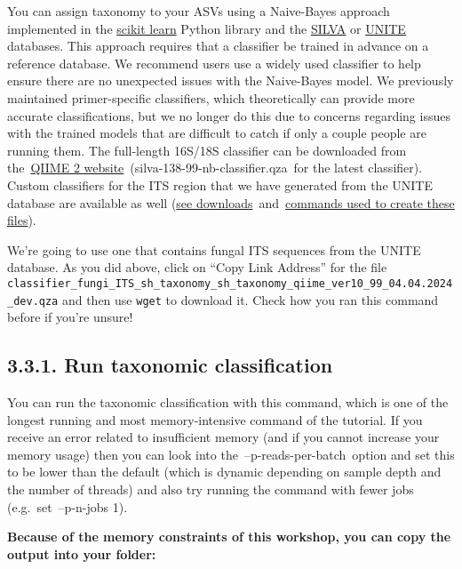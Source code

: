\documentclass[
]{book}
\begin{document}
You can assign taxonomy to your ASVs using a Naive-Bayes approach implemented in the \href{http://scikit-learn.org/stable/}{scikit learn} Python library and the \href{https://www.arb-silva.de/}{SILVA} or \href{https://unite.ut.ee/}{UNITE} databases. This approach requires that a classifier be trained in advance on a reference database. We recommend users use a widely used classifier to help ensure there are no unexpected issues with the Naive-Bayes model. We previously maintained primer-specific classifiers, which theoretically can provide more accurate classifications, but we no longer do this due to concerns regarding issues with the trained models that are difficult to catch if only a couple people are running them. The full-length 16S/18S classifier can be downloaded from the~\href{https://docs.qiime2.org/2022.11/data-resources/}{QIIME 2 website}~(silva-138-99-nb-classifier.qza~for the latest classifier). Custom classifiers for the ITS region that we have generated from the UNITE database are available as well (\href{http://kronos.pharmacology.dal.ca/public_files/MH/taxa_classifiers/scikit-learn_v1.4.2_classifiers/}{see downloads}~and~\href{https://github.com/LangilleLab/microbiome_helper/wiki/Creating-QIIME-2-Taxonomic-Classifiers}{commands used to create these files}).

We're going to use one that contains fungal ITS sequences from the UNITE database. As you did above, click on ``Copy Link Address'' for the file \texttt{classifier\_fungi\_ITS\_sh\_taxonomy\_sh\_taxonomy\_qiime\_ver10\_99\_04.04.2024\_dev.qza} and then use \texttt{wget} to download it. Check how you ran this command before if you're unsure!

\subsection{3.3.1. Run taxonomic classification}\label{run-taxonomic-classification-2}

You can run the taxonomic classification with this command, which is one of the longest running and most memory-intensive command of the tutorial. If you receive an error related to insufficient memory (and if you cannot increase your memory usage) then you can look into the~--p-reads-per-batch~option and set this to be lower than the default (which is dynamic depending on sample depth and the number of threads) and also try running the command with fewer jobs (e.g.~set~--p-n-jobs 1).

\textbf{Because of the memory constraints of this workshop, you can copy the output into your folder:}
\end{document}
